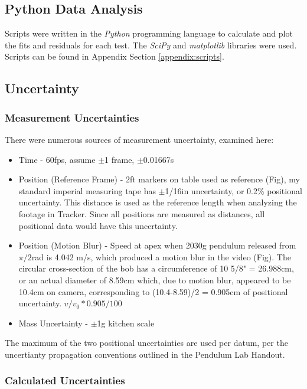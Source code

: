 \documentclass[12pt]{article}
\begin{document}
\subsection{Python Data Analysis}
Scripts were written in the \emph{Python} programming language\cite{python} to calculate and plot the fits and residuals for each test. The \emph{SciPy}\cite{scipy} and \emph{matplotlib}\cite{matplotlib} libraries were used. Scripts can be found in Appendix Section \ref{appendix:scripts}.
\pagebreak
\subsection{Uncertainty}
\label{section:uncertainty}

\subsubsection{Measurement Uncertainties}
\noindent
There were numerous sources of measurement uncertainty, examined here:
\begin{itemize}
    \item Time - 60fps, assume $\pm$1 frame, $\pm$0.01667s
    \item Position (Reference Frame) - 2ft markers on table used as reference (Fig), my standard imperial measuring tape has $\pm$1/16in uncertainty, or 0.2\% positional uncertainty. This distance is used as the reference length when analyzing the footage in Tracker. Since all positions are measured as distances, all positional data would have this uncertainty.
    \item Position (Motion Blur) - Speed at apex when 2030g pendulum released from $\pi/2$rad is 4.042 m/s, which produced a motion blur in the video (Fig). The circular cross-section of the bob has a circumference of 10 5/8" = 26.988cm, or an actual diameter of 8.59cm which, due to motion blur, appeared to be 10.4cm on camera, corresponding to (10.4-8.59)/2 = 0.905cm of positional uncertainty. $v/v_0 * 0.905 / 100$
    \item Mass Uncertainty - $\pm$1g kitchen scale
\end{itemize}

The maximum of the two positional uncertainties are used per datum, per the uncertianty propagation conventions outlined in the Pendulum Lab Handout.

\subsubsection{Calculated Uncertainties}
\end{document}
